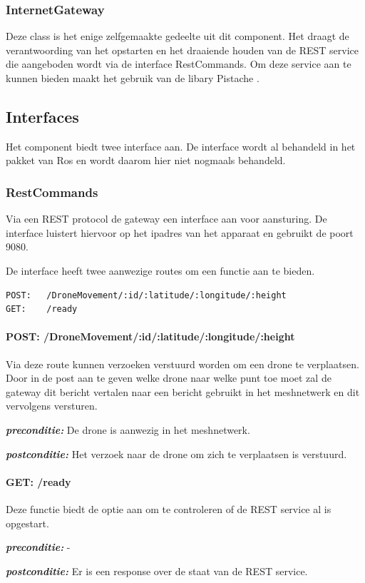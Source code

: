 \documentclass[a4paper, 11pt, oneside]{report}
\begin{document}
\subsubsection{InternetGateway}
Deze class is het enige zelfgemaakte gedeelte uit dit component. 
Het draagt de verantwoording van het opstarten en het draaiende houden van de REST service die aangeboden wordt via de interface RestCommands.
Om deze service aan te kunnen bieden maakt het gebruik van de libary Pistache \cite{pisrest}.

\subsection{Interfaces}
Het component biedt twee interface aan. 
De interface  wordt al behandeld in het pakket van Ros en wordt daarom hier niet nogmaals behandeld.
\subsubsection{RestCommands}
Via een REST protocol de gateway een interface aan voor aansturing.
De interface luistert hiervoor op het ipadres van het apparaat en gebruikt de poort 9080.

De interface heeft twee aanwezige routes om een functie aan te bieden.

\begin{lstlisting}
POST:	/DroneMovement/:id/:latitude/:longitude/:height
GET:	/ready
\end{lstlisting}

\paragraph{POST: /DroneMovement/:id/:latitude/:longitude/:height}
Via deze route kunnen verzoeken verstuurd worden om een drone te verplaatsen.
Door in de post aan te geven welke drone naar welke punt toe moet zal de gateway dit bericht vertalen naar een bericht gebruikt in het meshnetwerk en dit vervolgens versturen.

\textbf{\textit{preconditie:}} De drone is aanwezig in het meshnetwerk.

\textbf{\textit{postconditie:}} Het verzoek naar de drone om zich te verplaatsen is verstuurd.


\paragraph{GET: /ready}
Deze functie biedt de optie aan om te controleren of de REST service al is opgestart.

\textbf{\textit{preconditie:}} -

\textbf{\textit{postconditie:}} Er is een response over de staat van de REST service.






\clearpage
\appendix
\end{document}
